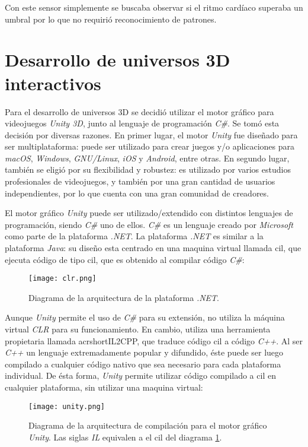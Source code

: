 Con este sensor simplemente se buscaba observar si el ritmo cardíaco superaba un umbral por lo que no requirió reconocimiento de patrones.

\section{Desarrollo de universos 3D interactivos} \label{sec:unity-net}

Para el desarrollo de universos 3D se decidió utilizar el motor gráfico para videojuegos \emph{Unity 3D}, junto al lenguaje de programación \emph{C\#}. Se tomó esta decisión por diversas razones. En primer lugar, el motor \emph{Unity} fue diseñado para ser multiplataforma: puede ser utilizado para crear juegos y/o aplicaciones para \emph{macOS}, \emph{Windows}, \emph{GNU/Linux}, \emph{iOS} y \emph{Android}, entre otras. En segundo lugar, también se eligió por su flexibilidad y robustez: es utilizado por varios estudios profesionales de videojuegos, y también por una gran cantidad de usuarios independientes, por lo que cuenta con una gran comunidad de creadores.

El motor gráfico \emph{Unity} puede ser utilizado/extendido con distintos lenguajes de programación, siendo \emph{C\#} uno de ellos. \emph{C\#} es un lenguaje creado por \emph{Microsoft} como parte de la plataforma \emph{.NET}.  La plataforma \emph{.NET} es similar a la plataforma \emph{Java}: su diseño esta centrado en una maquina virtual llamada \gls{cil}, que ejecuta código de tipo \acrshort{cil}, que es obtenido al compilar código \emph{C\#}:

\begin{figure}[H]
	\centering
    \texttt{[image: clr.png]}
    \caption{Diagrama de la arquitectura de la plataforma \emph{.NET}.}
	\label{fig:net-clr}
\end{figure}

Aunque \emph{Unity} permite el uso de \emph{C\#} para su extensión, no utiliza la máquina virtual \emph{CLR} para su funcionamiento. En cambio, utiliza una herramienta propietaria llamada acrshort{IL2CPP}, que traduce código \acrshort{cil} a código \emph{C++}. Al ser \emph{C++} un lenguaje extremadamente popular y difundido, éste puede ser luego compilado a cualquier código nativo que sea necesario para cada plataforma individual. De ésta forma, \emph{Unity} permite utilizar código compilado a \acrshort{cil} en cualquier plataforma, sin utilizar una maquina virtual:

\begin{figure}[H]
	\centering
    \texttt{[image: unity.png]}
    \caption{Diagrama de la arquitectura de compilación para el motor gráfico \emph{Unity}. Las siglas \emph{IL} equivalen a el \acrshort{cil} del diagrama \ref{fig:net-clr}.}
	\label{fig:unity}
\end{figure}

